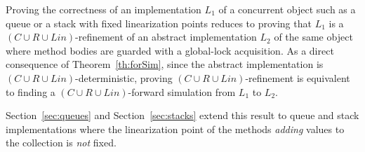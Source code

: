 Proving the correctness of an implementation $L_1$ of a concurrent object such as a queue or a stack with fixed linearization points
reduces to proving that $L_1$ is a $(C\cup R\cup Lin)$-refinement of an abstract implementation $L_2$ of the same object where method
bodies are guarded with a global-lock acquisition. As a direct consequence of Theorem~\ref{th:forSim}, since the abstract implementation is 
 $(C\cup R\cup Lin)$-deterministic, proving $(C\cup R\cup Lin)$-refinement is equivalent to finding a $(C\cup R\cup Lin)$-forward simulation 
from $L_1$ to $L_2$.

Section~\ref{sec:queues} and Section~\ref{sec:stacks} extend this result to queue and stack implementations where the linearization point of the methods 
\emph{adding} values to the collection is \emph{not} fixed.
